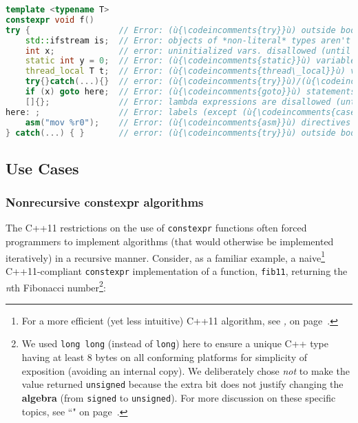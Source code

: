 \begin{lstlisting}[language=C++]
template <typename T>
constexpr void f()
try {                  // Error: (ù{\codeincomments{try}}ù) outside body isn't allowed (until C++20).
    std::ifstream is;  // Error: objects of *non-literal* types aren't allowed.
    int x;             // error: uninitialized vars. disallowed (until C++20)
    static int y = 0;  // Error: (ù{\codeincomments{static}}ù) variables are disallowed.
    thread_local T t;  // Error: (ù{\codeincomments{thread\_local}}ù) variables are disallowed.
    try{}catch(...){}  // error: (ù{\codeincomments{try}}ù)/(ù{\codeincomments{catch}}ù) disallowed (until C++20)
    if (x) goto here;  // Error: (ù{\codeincomments{goto}}ù) statements are disallowed.
    []{};              // Error: lambda expressions are disallowed (until C++17).
here: ;                // Error: labels (except (ù{\codeincomments{case}}ù)/(ù{\codeincomments{default}}ù)) aren't allowed.
    asm("mov %r0");    // Error: (ù{\codeincomments{asm}}ù) directives are disallowed.
} catch(...) { }       // error: (ù{\codeincomments{try}}ù) outside body disallowed (until C++20)
\end{lstlisting}


\subsection[Use Cases]{Use Cases}\label{use-cases-relaxedconstexpr}

\subsubsection[Nonrecursive {\tt constexpr} algorithms]{Nonrecursive {\SubsubsecCode constexpr} algorithms}\label{non-recursive-constexpr-algorithms}

The C++11 restrictions on the use of \texttt{constexpr} functions often
forced programmers to implement algorithms (that would otherwise be
implemented iteratively) in a recursive manner. Consider, as a familiar
example, a naive{\cprotect\footnote{For a more efficient (yet less
intuitive) C++11 algorithm, see \textit{, } on page~\pageref{recursive-fibonacci}.}}
C++11-compliant \texttt{constexpr} implementation of a function,
\texttt{fib11}, returning the \emph{n}th Fibonacci number\footnote{We used \texttt{long}~\texttt{long} (instead of \texttt{long})
here to ensure a unique C++ type having at least 8 bytes on all
conforming platforms for simplicity of exposition (avoiding an internal
copy). We deliberately chose \emph{not} to make the value returned
\texttt{unsigned} because the extra bit does not justify changing the
\textbf{algebra} (from \texttt{signed} to \texttt{unsigned}). For more
discussion on these specific topics, see ``" on page~\pageref{long-long}.}:

